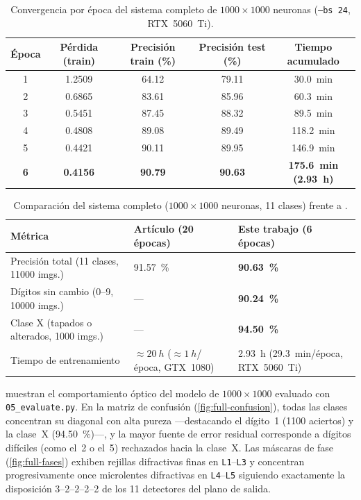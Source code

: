 \begin{table}[!htbp]
\centering
\caption{Convergencia por época del sistema completo de $1000\times1000$ neuronas (\texttt{--bs 24}, RTX~5060~Ti).}
\label{tab:full-hist}
\begin{tabular}{@{}ccccc@{}}
\toprule
Época & Pérdida (train) & Precisión train (\%) & Precisión test (\%) & Tiempo acumulado\\
\midrule
1 & 1.2509 & 64.12 & 79.11 & \SI{30.0}{min}\\
2 & 0.6865 & 83.61 & 85.96 & \SI{60.3}{min}\\
3 & 0.5451 & 87.45 & 88.32 & \SI{89.5}{min}\\
4 & 0.4808 & 89.08 & 89.49 & \SI{118.2}{min}\\
5 & 0.4421 & 90.11 & 89.95 & \SI{146.9}{min}\\
\textbf{6} & \textbf{0.4156} & \textbf{90.79} & \textbf{90.63} & \textbf{\SI{175.6}{min} (\SI{2.93}{h})}\\
\bottomrule
\end{tabular}
\end{table}

\begin{table}[!htbp]
\centering
\small
\caption[Resultados del sistema completo de $1000\times1000$ neuronas]{Comparación del sistema completo ($1000\times1000$ neuronas, 11 clases) frente a \textcite{chen2021}.}
\label{tab:full}
\begin{tabularx}{\textwidth}{@{}>{\raggedright\arraybackslash}X>{\centering\arraybackslash}p{4.3cm}>{\centering\arraybackslash}p{4.3cm}@{}}
\toprule
Métrica & Artículo (20 épocas) & Este trabajo (6 épocas)\\
\midrule
Precisión total (11 clases, \num{11000} imgs.) & \SI{91.57}{\percent} & \textbf{\SI{90.63}{\percent}}\\
Dígitos sin cambio (0--9, \num{10000} imgs.) & --- & \textbf{\SI{90.24}{\percent}}\\
Clase X (tapados o alterados, \num{1000} imgs.) & --- & \textbf{\SI{94.50}{\percent}}\\
Tiempo de entrenamiento & $\approx\SI{20}{h}$ ($\approx\SI{1}{h}$/época, GTX~1080) & \SI{2.93}{h} (\SI{29.3}{min}/época, RTX~5060~Ti)\\
\bottomrule
\end{tabularx}
\end{table}

muestran el comportamiento óptico del modelo de $1000\times1000$ evaluado con
\texttt{05\_evaluate.py}. En la matriz de confusión (\cref{fig:full-confusion}), todas las
clases concentran su diagonal con alta pureza —destacando el dígito~1 (\num{1100} aciertos) y
la clase~X (\SI{94.50}{\percent})—, y la mayor fuente de error residual corresponde a dígitos
difíciles (como el~2 o el~5) rechazados hacia la clase~X. Las máscaras de fase
(\cref{fig:full-fases}) exhiben rejillas difractivas finas en \texttt{L1}--\texttt{L3} y
concentran progresivamente once microlentes difractivas en \texttt{L4}--\texttt{L5} siguiendo
exactamente la disposición 3--2--2--2--2 de los 11 detectores del plano de salida.

